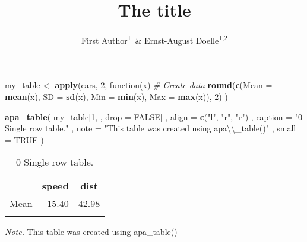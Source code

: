 \documentclass[english,man]{apa6}
\title{The title}
\author{First Author\textsuperscript{1}~\& Ernst-August Doelle\textsuperscript{1,2}}
\affiliation{
    \vspace{0.5cm}
          \textsuperscript{1} Wilhelm-Wundt-University\\
          \textsuperscript{2} Konstanz Business School  }
\newenvironment{Shaded}{\begin{snugshade}}{\end{snugshade}}
\newcommand{\KeywordTok}[1]{\textcolor[rgb]{0.13,0.29,0.53}{\textbf{{#1}}}}
\newcommand{\DataTypeTok}[1]{\textcolor[rgb]{0.13,0.29,0.53}{{#1}}}
\newcommand{\DecValTok}[1]{\textcolor[rgb]{0.00,0.00,0.81}{{#1}}}
\newcommand{\CharTok}[1]{\textcolor[rgb]{0.31,0.60,0.02}{{#1}}}
\newcommand{\StringTok}[1]{\textcolor[rgb]{0.31,0.60,0.02}{{#1}}}
\newcommand{\CommentTok}[1]{\textcolor[rgb]{0.56,0.35,0.01}{\textit{{#1}}}}
\newcommand{\OtherTok}[1]{\textcolor[rgb]{0.56,0.35,0.01}{{#1}}}
\newcommand{\NormalTok}[1]{{#1}}
\begin{document}
\maketitle

\setcounter{secnumdepth}{0}



\begin{Shaded}
\begin{Highlighting}[]
\NormalTok{my_table <-}\StringTok{ }\KeywordTok{apply}\NormalTok{(cars, }\DecValTok{2}\NormalTok{, function(x) }\CommentTok{# Create data}
  \KeywordTok{round}\NormalTok{(}\KeywordTok{c}\NormalTok{(}\DataTypeTok{Mean =} \KeywordTok{mean}\NormalTok{(x), }\DataTypeTok{SD =} \KeywordTok{sd}\NormalTok{(x), }\DataTypeTok{Min =} \KeywordTok{min}\NormalTok{(x), }\DataTypeTok{Max =} \KeywordTok{max}\NormalTok{(x)), }\DecValTok{2}\NormalTok{)}
\NormalTok{)}

\KeywordTok{apa_table}\NormalTok{(}
  \NormalTok{my_table[}\DecValTok{1}\NormalTok{, , }\DataTypeTok{drop =} \OtherTok{FALSE}\NormalTok{]}
  \NormalTok{, }\DataTypeTok{align =} \KeywordTok{c}\NormalTok{(}\StringTok{"l"}\NormalTok{, }\StringTok{"r"}\NormalTok{, }\StringTok{"r"}\NormalTok{)}
  \NormalTok{, }\DataTypeTok{caption =} \StringTok{"0 Single row table."}
  \NormalTok{, }\DataTypeTok{note =} \StringTok{"This table was created using apa}\CharTok{\textbackslash{}\textbackslash{}}\StringTok{_table()"}
  \NormalTok{, }\DataTypeTok{small =} \OtherTok{TRUE}
\NormalTok{)}
\end{Highlighting}
\end{Shaded}

\begin{table}[tbp]
\begin{center}
\begin{threeparttable}
\caption{\label{tab:unnamed-chunk-2}0 Single row table.}
\small{
\begin{tabular}{lrr}
\toprule
 & \multicolumn{1}{c}{speed} & \multicolumn{1}{c}{dist}\\
\midrule
Mean & 15.40 & 42.98\\
\bottomrule
\addlinespace
\end{tabular}
}
\begin{tablenotes}[para]
\textit{Note.} This table was created using apa\_table()
\end{tablenotes}
\end{threeparttable}
\end{center}
\end{table}
\end{document}
